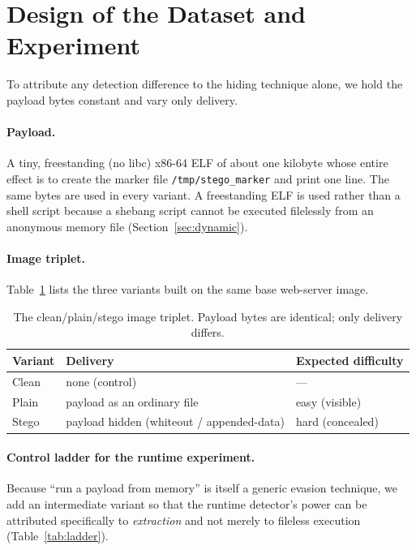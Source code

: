 \documentclass[sigconf,nonacm]{acmart}
\begin{document}
\section{Design of the Dataset and Experiment}
\label{sec:design}
To attribute any detection difference to the hiding technique alone, we hold the
payload bytes constant and vary only delivery.

\paragraph{Payload.} A tiny, freestanding (no libc) x86-64 ELF of about one
kilobyte whose entire effect is to create the marker file
\texttt{/tmp/stego\_marker} and print one line. The same bytes are used in every
variant. A freestanding ELF is used rather than a shell script because a shebang
script cannot be executed filelessly from an anonymous memory file
(Section~\ref{sec:dynamic}).

\paragraph{Image triplet.} Table~\ref{tab:triplet} lists the three variants built
on the same base web-server image.

\begin{table}[t]
\caption{The clean/plain/stego image triplet. Payload bytes are identical;
only delivery differs.}
\label{tab:triplet}
\small
\begin{tabular}{@{}lll@{}}
\toprule
Variant & Delivery & Expected difficulty \\
\midrule
Clean & none (control) & --- \\
Plain & payload as an ordinary file & easy (visible) \\
Stego & payload hidden (whiteout / appended-data) & hard (concealed) \\
\bottomrule
\end{tabular}
\end{table}

\paragraph{Control ladder for the runtime experiment.} Because ``run a payload
from memory'' is itself a generic evasion technique, we add an intermediate
variant so that the runtime detector's power can be attributed specifically to
\emph{extraction} and not merely to fileless execution
(Table~\ref{tab:ladder}).
\end{document}
